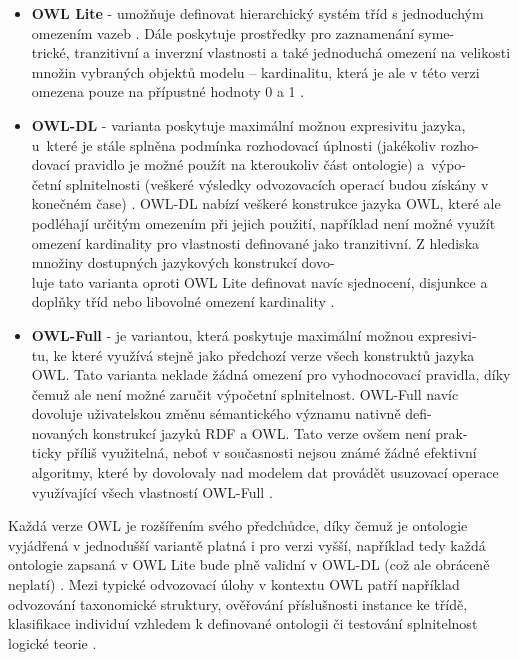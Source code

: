 \documentclass{projekt}
\begin{document}
\begin {itemize}

\item \textbf{OWL Lite} - umožňuje definovat hierarchický systém tříd s jednoduchým omezením vazeb \cite{_11}. Dále poskytuje prostředky pro zaznamenání syme-\\trické, tranzitivní a inverzní vlastnosti a také jednoduchá omezení na velikosti množin vybraných objektů modelu – kardinalitu, která je ale v této verzi omezena pouze na přípustné hodnoty 0 a 1 \cite{_2}.
\item \textbf{OWL-DL} - varianta poskytuje maximální možnou expresivitu jazyka, u~které je stále splněna podmínka rozhodovací úplnosti (jakékoliv rozho-\\dovací pravidlo je možné použít na kteroukoliv část ontologie) a~výpo-\\četní splnitelnosti (veškeré výsledky odvozovacích operací budou získány v konečném čase) \cite{_2}. OWL-DL nabízí veškeré konstrukce jazyka OWL, které ale podléhají určitým omezením při jejich použití, například není možné využít omezení kardinality pro vlastnosti definované jako tranzitivní. Z hlediska množiny dostupných jazykových konstrukcí dovo-\\luje tato varianta oproti OWL Lite definovat navíc sjednocení, disjunkce a doplňky tříd nebo libovolné omezení kardinality \cite{_11}.
\item \textbf{OWL-Full} - je variantou, která poskytuje maximální možnou expresivi-\\tu, ke které využívá stejně jako předchozí verze všech konstruktů jazyka OWL. Tato varianta neklade žádná omezení pro vyhodnocovací pravidla, díky čemuž ale není možné zaručit výpočetní splnitelnost. OWL-Full navíc dovoluje uživatelskou změnu sémantického významu nativně defi-\\novaných konstrukcí jazyků RDF a OWL. Tato verze ovšem není prak-\\ticky příliš využitelná, neboť v současnosti nejsou známé žádné efektivní algoritmy, které by dovolovaly nad modelem dat provádět usuzovací operace využívající všech vlastností OWL-Full \cite{_2}.

\end {itemize}

Každá verze OWL je rozšířením svého předchůdce, díky čemuž je ontologie vyjádřená v jednodušší variantě platná i pro verzi vyšší, například tedy každá ontologie zapsaná v OWL Lite bude plně validní v OWL-DL (což ale obráceně neplatí) \cite{_11}.
Mezi typické odvozovací úlohy v kontextu OWL patří například odvozování taxonomické struktury, ověřování příslušnosti instance ke třídě, klasifikace individuí vzhledem k definované ontologii či testování splnitelnost logické teorie \cite{_12}.
\end{document}
